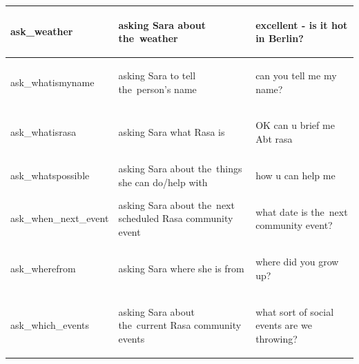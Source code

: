 \documentclass[bsc,frontabs,singlespacing,parskip,deptreport]{infthesis}
\begin{document}
{\begin{center}
\begin{longtable}{p{}|p{}|p{}}
    \hline
    \begin{spverbatim}ask_weather\end{spverbatim} & asking Sara about the~weather & \begin{spverbatim}excellent - is it hot in Berlin?\end{spverbatim} \\
    \hline
    \begin{spverbatim}ask_whatismyname\end{spverbatim} & asking Sara to tell the~person's name & \begin{spverbatim}can you tell me my name?\end{spverbatim} \\
    \hline
    \begin{spverbatim}ask_whatisrasa\end{spverbatim} & asking Sara what Rasa is & \begin{spverbatim}OK can u brief me Abt rasa\end{spverbatim} \\
    \hline
    \begin{spverbatim}ask_whatspossible\end{spverbatim} & asking Sara about the~things she can do/help with & \begin{spverbatim}how u can help me\end{spverbatim} \\
    \hline
    \begin{spverbatim}ask_when_next_event\end{spverbatim} & asking Sara about the~next scheduled Rasa community event & \begin{spverbatim}what date is the~next community event?\end{spverbatim} \\
    \hline
    \begin{spverbatim}ask_wherefrom\end{spverbatim} & asking Sara where she is from & \begin{spverbatim}where did you grow up?\end{spverbatim} \\
    \hline
    \begin{spverbatim}ask_which_events\end{spverbatim} & asking Sara about the~current Rasa community events & \begin{spverbatim}what sort of social events are we throwing?\end{spverbatim} \\

\end{longtable}
\end{center}}
\end{document}
